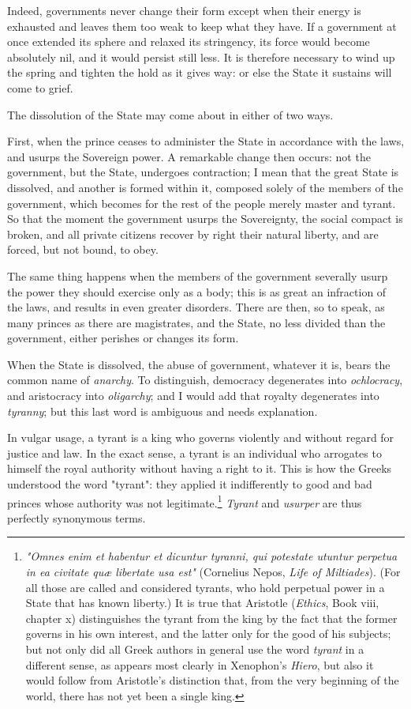 \documentclass[12pt]{report}
\begin{document}
Indeed, governments never change their form except when their energy is exhausted and leaves them too weak to keep what they have. If a government at once extended its sphere and relaxed its stringency, its force would become absolutely nil, and it would persist still less. It is therefore necessary to wind up the spring and tighten the hold as it gives way: or else the State it sustains will come to grief.

The dissolution of the State may come about in either of two ways.

First, when the prince ceases to administer the State in accordance with the laws, and usurps the Sovereign power. A remarkable change then occurs: not the government, but the State, undergoes contraction; I mean that the great State is dissolved, and another is formed within it, composed solely of the members of the government, which becomes for the rest of the people merely master and tyrant. So that the moment the government usurps the Sovereignty, the social compact is broken, and all private citizens recover by right their natural liberty, and are forced, but not bound, to obey.

The same thing happens when the members of the government severally usurp the power they should exercise only as a body; this is as great an infraction of the laws, and results in even greater disorders. There are then, so to speak, as many princes as there are magistrates, and the State, no less divided than the government, either perishes or changes its form.

When the State is dissolved, the abuse of government, whatever it is, bears the common name of \textit{anarchy}. To distinguish, democracy degenerates into \textit{ochlocracy}, and aristocracy into \textit{oligarchy}; and I would add that royalty degenerates into \textit{tyranny}; but this last word is ambiguous and needs explanation.

In vulgar usage, a tyrant is a king who governs violently and without regard for justice and law. In the exact sense, a tyrant is an individual who arrogates to himself the royal authority without having a right to it. This is how the Greeks understood the word "tyrant": they applied it indifferently to good and bad princes whose authority was not legitimate.\footnote{\textit{"Omnes enim et habentur et dicuntur tyranni, qui potestate utuntur perpetua in ea civitate quæ libertate usa est"} (Cornelius Nepos, \textit{Life of Miltiades}). (For all those are called and considered tyrants, who hold perpetual power in a State that has known liberty.) It is true that Aristotle (\textit{Ethics}, Book viii, chapter x) distinguishes the tyrant from the king by the fact that the former governs in his own interest, and the latter only for the good of his subjects; but not only did all Greek authors in general use the word \textit{tyrant} in a different sense, as appears most clearly in Xenophon's \textit{Hiero}, but also it would follow from Aristotle's distinction that, from the very beginning of the world, there has not yet been a single king.} \textit{Tyrant} and \textit{usurper} are thus perfectly synonymous terms.
\end{document}

